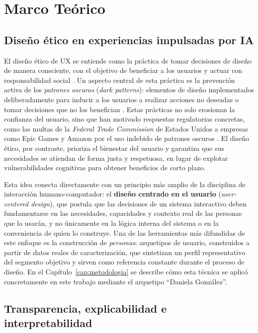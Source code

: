 \chapter{Marco Teórico}\label{cap:marco}

\section{Diseño ético en experiencias impulsadas por IA}

El diseño ético de UX se entiende como la práctica de tomar decisiones de diseño de manera consciente, con el objetivo de beneficiar a los usuarios y actuar con responsabilidad social \citep{keepcoding2024etica}. Un aspecto central de esta práctica es la prevención activa de los \emph{patrones oscuros} (\emph{dark patterns}): elementos de diseño implementados deliberadamente para inducir a los usuarios a realizar acciones no deseadas o tomar decisiones que no los benefician \citep{checkealos2024etica}. Estas prácticas no solo erosionan la confianza del usuario, sino que han motivado respuestas regulatorias concretas, como las multas de la \emph{Federal Trade Commission} de Estados Unidos a empresas como Epic Games y Amazon por el uso indebido de patrones oscuros \citep{checkealos2024etica}. El diseño ético, por contraste, prioriza el bienestar del usuario y garantiza que sus necesidades se atiendan de forma justa y respetuosa, en lugar de explotar vulnerabilidades cognitivas para obtener beneficios de corto plazo.

Esta idea conecta directamente con un principio más amplio de la disciplina de interacción humano-computador: el \textbf{diseño centrado en el usuario} (\emph{user-centered design}), que postula que las decisiones de un sistema interactivo deben fundamentarse en las necesidades, capacidades y contexto real de las personas que lo usarán, y no únicamente en la lógica interna del sistema o en la conveniencia de quien lo construye. Una de las herramientas más difundidas de este enfoque es la construcción de \emph{personas}: arquetipos de usuario, construidos a partir de datos reales de caracterización, que sintetizan un perfil representativo del segmento objetivo y sirven como referencia constante durante el proceso de diseño. En el Capítulo~\ref{cap:metodologia} se describe cómo esta técnica se aplicó concretamente en este trabajo mediante el arquetipo ``Daniela González''.

\section{Transparencia, explicabilidad e interpretabilidad}


